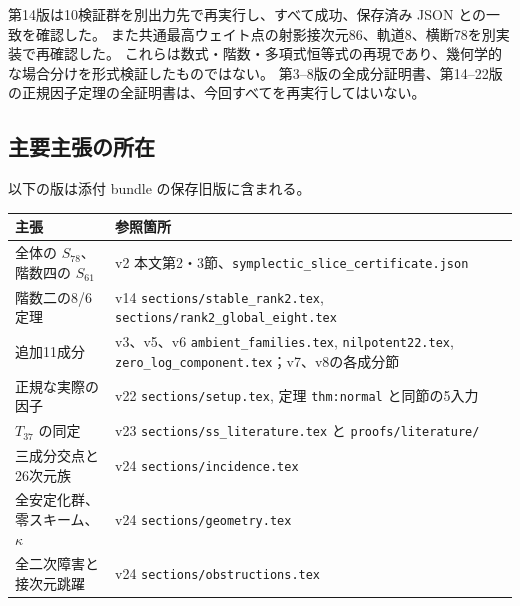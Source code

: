\documentclass[11pt,a4paper]{ltjsarticle}
\theoremstyle{remark}\newtheorem{remark}[proposition]{注意}
\begin{document}
第14版は10検証群を別出力先で再実行し、すべて成功、保存済み JSON との一致を確認した。
また共通最高ウェイト点の射影接次元86、軌道8、横断78を別実装で再確認した。
これらは数式・階数・多項式恒等式の再現であり、幾何学的な場合分けを形式検証したものではない。
第3--8版の全成分証明書、第14--22版の正規因子定理の全証明書は、今回すべてを再実行してはいない。

\subsection{主要主張の所在}

以下の版は添付 bundle の保存旧版に含まれる。
\begin{center}\small
\begin{tabular}{@{}p{39mm}p{116mm}@{}}\toprule
主張 & 参照箇所\\\midrule
全体の $S_{78}$、階数四の $S_{61}$ & v2 本文第2・3節、\texttt{symplectic\_slice\_certificate.json}\\
階数二の8/6定理 & v14 \texttt{sections/stable\_rank2.tex}, \texttt{sections/rank2\_global\_eight.tex}\\
追加11成分 & v3、v5、v6 \texttt{ambient\_families.tex}, \texttt{nilpotent22.tex}, \texttt{zero\_log\_component.tex}；v7、v8の各成分節\\
正規な実際の因子 & v22 \texttt{sections/setup.tex}, 定理 \texttt{thm:normal} と同節の5入力\\
$T_{37}$ の同定 & v23 \texttt{sections/ss\_literature.tex} と \texttt{proofs/literature/}\\
三成分交点と26次元族 & v24 \texttt{sections/incidence.tex}\\
全安定化群、零スキーム、$\kappa$ & v24 \texttt{sections/geometry.tex}\\
全二次障害と接次元跳躍 & v24 \texttt{sections/obstructions.tex}\\\bottomrule
\end{tabular}
\end{center}
\end{document}
